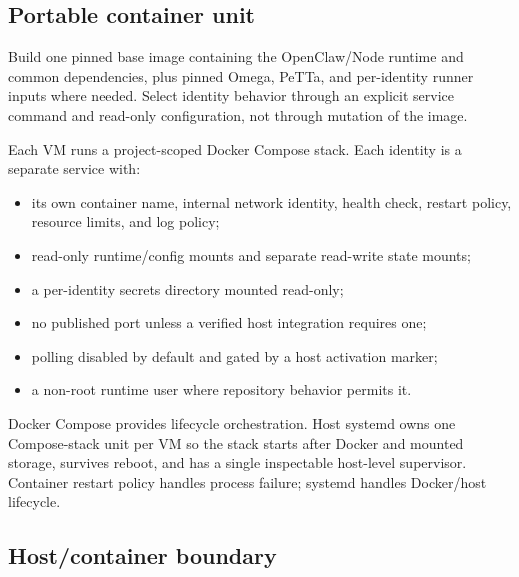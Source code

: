 \documentclass[11pt]{article}
\begin{document}
\subsection{Portable container unit}

Build one pinned base image containing the OpenClaw/Node runtime and common
dependencies, plus pinned Omega, PeTTa, and per-identity runner inputs where
needed. Select identity behavior through an explicit service command and
read-only configuration, not through mutation of the image.

Each VM runs a project-scoped Docker Compose stack. Each identity is a separate
service with:
\begin{itemize}
\item its own container name, internal network identity, health check, restart
policy, resource limits, and log policy;
\item read-only runtime/config mounts and separate read-write state mounts;
\item a per-identity secrets directory mounted read-only;
\item no published port unless a verified host integration requires one;
\item polling disabled by default and gated by a host activation marker;
\item a non-root runtime user where repository behavior permits it.
\end{itemize}

Docker Compose provides lifecycle orchestration. Host systemd owns one
Compose-stack unit per VM so the stack starts after Docker and mounted storage,
survives reboot, and has a single inspectable host-level supervisor. Container
restart policy handles process failure; systemd handles Docker/host lifecycle.

\subsection{Host/container boundary}
\end{document}

